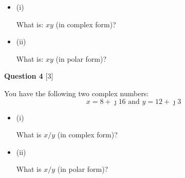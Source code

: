 \documentclass[12pt]{article}
\newcommand{\bit}{\begin{itemize}}
\newcommand{\eit}{\end{itemize}}
\begin{document}
\bit 

\item[(i)]

What is: $xy$ (in complex form)?

\vspace{1.5in}
\item[(ii)]

What is: $xy$ (in polar form)?


\vspace{1.5in}

\eit


\noindent
{\bf Question 4} [3]

You have the following two complex numbers: 
\[ 
x = 8 + \jmath 16 \text{  and  } y = 12 + \jmath 3
\]

\bit 

\item[(i)]

What is $x/y$ (in complex form)?

\vspace{1.5in}
\item[(ii)]

What is $x/y$ (in polar form)?

\vspace{1.5in}

\eit
\end{document}
